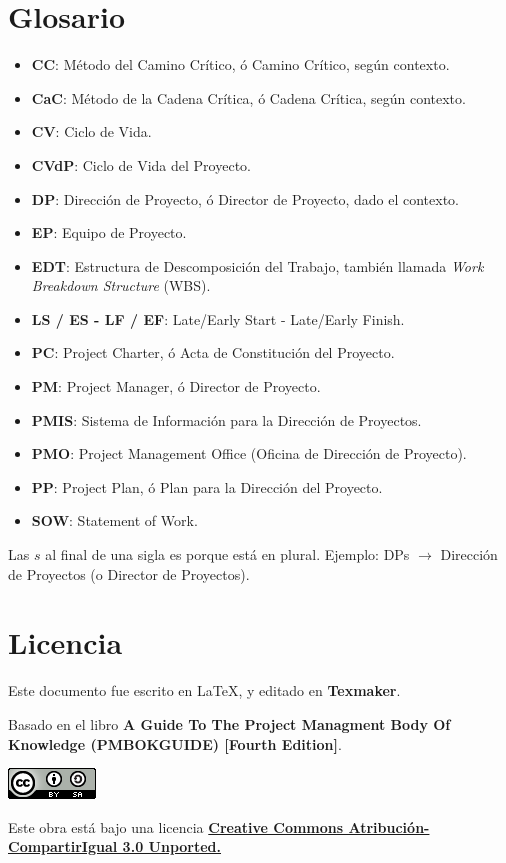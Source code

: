 \documentclass[10pt,a4paper]{article}
\begin{document}
\section{Glosario}
\begin{itemize}
\item \textbf{CC}: Método del Camino Crítico, ó Camino Crítico, según contexto.
\item \textbf{CaC}: Método de la Cadena Crítica, ó Cadena Crítica, según contexto.
\item \textbf{CV}: Ciclo de Vida.
\item \textbf{CVdP}: Ciclo de Vida del Proyecto.
\item \textbf{DP}: Dirección de Proyecto, ó Director de Proyecto, dado el contexto.
\item \textbf{EP}: Equipo de Proyecto.
\item \textbf{EDT}: Estructura de Descomposición del Trabajo, también llamada \textit{Work Breakdown Structure} (WBS).
\item \textbf{LS / ES - LF / EF}: Late/Early Start - Late/Early Finish.
\item \textbf{PC}: Project Charter, ó Acta de Constitución del Proyecto.
\item \textbf{PM}: Project Manager, ó Director de Proyecto.
\item \textbf{PMIS}: Sistema de Información para la Dirección de Proyectos.
\item \textbf{PMO}: Project Management Office (Oficina de Dirección de Proyecto).
\item \textbf{PP}: Project Plan, ó Plan para la Dirección del Proyecto.
\item \textbf{SOW}: Statement of Work.
\end{itemize}

Las $s$ al final de una sigla es porque está en plural. Ejemplo: DPs $\rightarrow$ Dirección de Proyectos (o Director de Proyectos).

\newpage
\section{Licencia}
Este documento fue escrito en \LaTeX, y editado en \textbf{Texmaker}.

Basado en el libro \textbf{A Guide To The Project Managment Body Of Knowledge (PMBOK\textregistered GUIDE) [Fourth Edition]}.
\null
\vfill
\begin{center}
\href{http://creativecommons.org/licenses/by-sa/3.0/}{
\includegraphics{CC.png}}

Este obra está bajo una licencia \href{http://creativecommons.org/licenses/by-sa/3.0/}{\textbf{Creative Commons Atribución-CompartirIgual 3.0 Unported.}}
\end{center}
\end{document}

